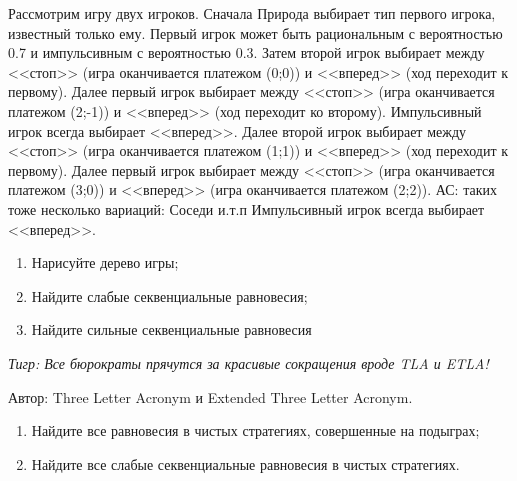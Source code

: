 \begin{problem}

Рассмотрим игру двух игроков. Сначала Природа выбирает тип первого игрока, известный только ему. Первый игрок может быть рациональным с вероятностью 0.7 и импульсивным с вероятностью 0.3. Затем второй игрок выбирает между <<стоп>> (игра оканчивается  платежом (0;0)) и <<вперед>> (ход переходит к первому). Далее первый игрок выбирает между <<стоп>> (игра оканчивается платежом (2;-1)) и <<вперед>> (ход переходит ко второму). Импульсивный игрок всегда выбирает <<вперед>>. Далее второй игрок выбирает между <<стоп>> (игра оканчивается платежом (1;1)) и <<вперед>> (ход переходит к первому). Далее первый игрок выбирает между <<стоп>> (игра оканчивается платежом (3;0)) и <<вперед>> (игра оканчивается платежом (2;2)). 
{\red АС: таких тоже несколько вариаций: Соседи и.т.п}
Импульсивный игрок всегда выбирает <<вперед>>. \par
\begin{enumerate}
\item Нарисуйте дерево игры; \par
\item Найдите слабые секвенциальные равновесия; \par
\item  Найдите {\red сильные} секвенциальные равновесия \par
\begin{source} 
\cite{lones:dtc}
\end{source}
\end{enumerate}


\begin{sol}

\end{sol}
\end{problem}



\begin{problem}[SPNE=WSE?]
{\it Тигр: Все бюрократы прячутся за красивые сокращения вроде TLA и ETLA!\par}
Автор: Three Letter Acronym и Extended Three Letter Acronym.\par
{}
\begin{enumerate}
\item Найдите все равновесия в чистых стратегиях, совершенные на подыграх;\par
\item  Найдите все слабые секвенциальные равновесия в чистых стратегиях.\par
\end{enumerate}


\begin{sol}

\end{sol}
\end{problem}



